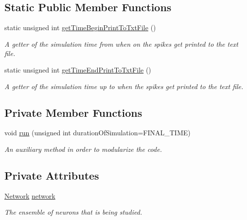 \subsection*{Static Public Member Functions}
\begin{DoxyCompactItemize}
\item 
static unsigned int \hyperlink{classSimulation_a474659676b4cc3e5c002a23df835be5c}{get\-Time\-Begin\-Print\-To\-Txt\-File} ()
\begin{DoxyCompactList}\small\item\em A getter of the simulation time from when on the spikes get printed to the text file. \end{DoxyCompactList}\item 
static unsigned int \hyperlink{classSimulation_a364b076cae1c94df74f3c608b02d9090}{get\-Time\-End\-Print\-To\-Txt\-File} ()
\begin{DoxyCompactList}\small\item\em A getter of the simulation time up to when the spikes get printed to the text file. \end{DoxyCompactList}\end{DoxyCompactItemize}
\subsection*{Private Member Functions}
\begin{DoxyCompactItemize}
\item 
void \hyperlink{classSimulation_a9c9a1b5e52b447c84977990ebd545f38}{run} (unsigned int duration\-Of\-Simulation=F\-I\-N\-A\-L\-\_\-\-T\-I\-M\-E)
\begin{DoxyCompactList}\small\item\em An auxiliary method in order to modularize the code. \end{DoxyCompactList}\end{DoxyCompactItemize}
\subsection*{Private Attributes}
\begin{DoxyCompactItemize}
\item 
\hypertarget{classSimulation_a7b3ddbe6f43ec8b5fee95f1a5cdedbbe}{\hyperlink{classNetwork}{Network} \hyperlink{classSimulation_a7b3ddbe6f43ec8b5fee95f1a5cdedbbe}{network}}\label{classSimulation_a7b3ddbe6f43ec8b5fee95f1a5cdedbbe}

\begin{DoxyCompactList}\small\item\em The ensemble of neurons that is being studied. \end{DoxyCompactList}\end{DoxyCompactItemize}
